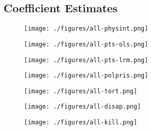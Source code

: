\documentclass[12pt]{article}
\begin{document}

\clearpage

\subsection{Coefficient Estimates}

\begin{figure}[!htpb]
\centering
\texttt{[image: ./figures/all-physint.png]}
\caption{}
\label{fig:all-physint}
\end{figure}

\begin{figure}[!htpb]
\centering
\texttt{[image: ./figures/all-pts-ols.png]}
\caption{}
\label{fig:all-pts-ols}
\end{figure}

\begin{figure}[!htpb]
\centering
\texttt{[image: ./figures/all-pts-lrm.png]}
\caption{}
\label{fig:all-pts-lrm}
\end{figure}

\begin{figure}[!htpb]
\centering
\texttt{[image: ./figures/all-polpris.png]}
\caption{}
\label{fig:all-polpris}
\end{figure}

\begin{figure}[!htpb]
\centering
\texttt{[image: ./figures/all-tort.png]}
\caption{}
\label{fig:all-tort}
\end{figure}

\begin{figure}[!htpb]
\centering
\texttt{[image: ./figures/all-disap.png]}
\caption{}
\label{fig:all-disap}
\end{figure}

\begin{figure}[!htpb]
\centering
\texttt{[image: ./figures/all-kill.png]}
\caption{}
\label{fig:all-kill}
\end{figure}
\end{document}
